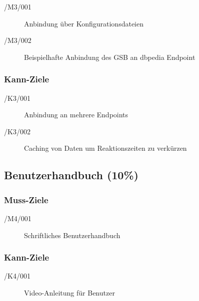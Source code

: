 \begin{description}
\item[/M3/001] Anbindung über Konfigurationsdateien
\item[/M3/002] Beispielhafte Anbindung des GSB an dbpedia Endpoint 
\end{description}

\subsubsection*{Kann-Ziele}

\begin{description}
\item[/K3/001] Anbindung an mehrere Endpoints
\item[/K3/002] Caching von Daten um Reaktionszeiten zu verkürzen
\end{description}

\subsection*{Benutzerhandbuch (10\%)}
 
\subsubsection*{Muss-Ziele}

\begin{description}
\item[/M4/001] Schriftliches Benutzerhandbuch
\end{description}

\subsubsection*{Kann-Ziele}

\begin{description}
\item[/K4/001] Video-Anleitung für Benutzer
\end{description}


